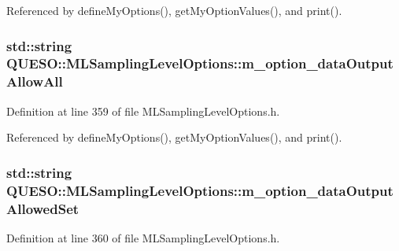 Referenced by define\-My\-Options(), get\-My\-Option\-Values(), and print().

\hypertarget{class_q_u_e_s_o_1_1_m_l_sampling_level_options_a27d13c15a4e8fbb4c748a3dc127feca8}{
\subsubsection[{m\-\_\-option\-\_\-data\-Output\-Allow\-All}]{\setlength{\rightskip}{0pt plus 5cm}std\-::string Q\-U\-E\-S\-O\-::\-M\-L\-Sampling\-Level\-Options\-::m\-\_\-option\-\_\-data\-Output\-Allow\-All\hspace{0.3cm}{\ttfamily [private]}}}\label{class_q_u_e_s_o_1_1_m_l_sampling_level_options_a27d13c15a4e8fbb4c748a3dc127feca8}


Definition at line 359 of file M\-L\-Sampling\-Level\-Options.\-h.



Referenced by define\-My\-Options(), get\-My\-Option\-Values(), and print().

\hypertarget{class_q_u_e_s_o_1_1_m_l_sampling_level_options_a9c4ef337e2c0c01cb6c8cbaa9a985f84}{
\subsubsection[{m\-\_\-option\-\_\-data\-Output\-Allowed\-Set}]{\setlength{\rightskip}{0pt plus 5cm}std\-::string Q\-U\-E\-S\-O\-::\-M\-L\-Sampling\-Level\-Options\-::m\-\_\-option\-\_\-data\-Output\-Allowed\-Set\hspace{0.3cm}{\ttfamily [private]}}}\label{class_q_u_e_s_o_1_1_m_l_sampling_level_options_a9c4ef337e2c0c01cb6c8cbaa9a985f84}


Definition at line 360 of file M\-L\-Sampling\-Level\-Options.\-h.



